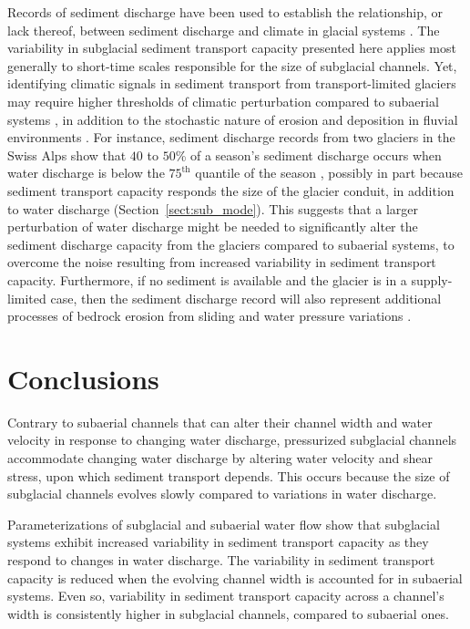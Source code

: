 \documentclass[11pt]{article}
\begin{document}
\begin{spacing}{1}
  Records of sediment discharge have been used to establish the relationship, or lack thereof, between sediment discharge and climate in glacial systems \citep[e.g.][]{koppes2009a,willenbring2016,mariotti2021}.
  The variability in subglacial sediment transport capacity presented here applies most generally to short-time scales responsible for the size of subglacial channels.
  Yet, identifying climatic signals in sediment transport from transport-limited glaciers may require higher thresholds of climatic perturbation compared to subaerial systems \citep{tofelde2021}, in addition to the stochastic nature of erosion and deposition in fluvial environments \citep{castletort2003,jerolmack2010,romans2016}.
  For instance, sediment discharge records from two glaciers in the Swiss Alps show that $40$ to $50$\% of a season's sediment discharge occurs when water discharge is below the $75^{\mathrm{th}}$ quantile of the season \citep{delaney2018}, possibly in part because sediment transport capacity responds the size of the glacier conduit, in addition to water discharge (Section~\ref{sect:sub_mode}).
  This suggests that a larger  perturbation of water discharge might be needed to significantly alter the sediment discharge capacity from the glaciers compared to subaerial systems, to overcome the noise resulting from increased variability in sediment transport capacity.
Furthermore, if no sediment is available and the glacier is in a supply-limited case, then the sediment discharge record will also represent additional processes of bedrock erosion from sliding and water pressure variations  \citep{iverson2012,herman2015}.

 
  \section{Conclusions}
  Contrary to subaerial channels that can alter their channel width and water velocity in response to changing water discharge,
   pressurized subglacial channels accommodate changing water discharge by altering water velocity and shear stress, upon which sediment transport depends.
  This occurs because the size of subglacial channels evolves slowly compared to variations in water discharge.
 
  Parameterizations of subglacial and subaerial water flow show that subglacial systems exhibit increased variability in sediment transport capacity as they respond  to changes in water discharge.
  The variability in sediment transport capacity is reduced when the evolving channel width is accounted for in subaerial systems.
  Even so, variability in sediment transport capacity across a channel's width is consistently higher in subglacial channels, compared to subaerial ones.
  

\end{spacing}
\end{document}

